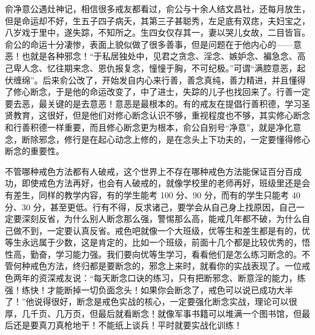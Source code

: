 俞净意公遇灶神记，相信很多戒友都看过，俞公与十余人结文昌社，还每月放生，但是命运却不好，生五子四子病夭，其第三子甚聪秀，左足底有双痣，夫妇宝之，八岁戏于里中，遂失踪，不知所之。生四女仅存其一，妻以哭儿女故，二目皆盲。俞公的命运十分凄惨，表面上貌似做了很多善事，但是问题在于他内心的——意恶！也就是各种邪念！“于私居独处中，见君之贪念、淫念、嫉妒念、褊急念、高己卑人念、忆往期来念、恩仇报复念，憧憧于胸，不可纪极。”可谓“满腔意恶，起伏缠绵”。后来俞公改了，开始发自内心来行善，善念真纯，善力精进，并且懂得了修心断念，于是他的命运改变了，中了进士，失踪的儿子也找回来了。行善一定要去恶，最关键的是去意恶！意恶是最根本的。有的戒友在提倡行善积德，学习圣贤教育，这很好，但是他们对修心断念认识不够，重视程度也不够，其实修心断念和行善积德一样重要，而且修心断念更为根本，俞公自别号“净意”，就是净化意念，断除邪念，修行是在起心动念上修的，是在念头上下功夫的，一定要懂得修心断念的重要性。

不管哪种戒色方法都有人破戒，这个世界上不存在哪种戒色方法能保证百分百成功，即使戒色方法再好，也会有人破戒的，就像学校里的老师再好，班级里还是会有差生，同样的教学内容，有的学生能考 100 分、90 分，而有的学生只能考 40 分、30 分，甚至更低。行有不得，反求诸己，要学会从自己身上找原因，自己一定要深刻反省，为什么别人断念那么强，警惕那么高，能戒几年都不破，为什么自己做不到，一定要认真反省。戒色吧就像一个大班级，优等生和差生都是有的，优等生永远属于少数，这是肯定的，比如一个班级，前面十几个都是比较优秀的，悟性高，勤奋，学习能力强。我们要向优等生学习，看看他们是怎么练习断念的。不管何种戒色方法，终归都是要断念的，邪念上来时，就看你的实战表现了。一位戒色两年的资深戒友说：“每天断念口诀的练习，只有把断邪念、断意淫的能力，练强！练快！才能断掉一切负面念头！如果你会断念了，戒色可以说已成功大半了！”他说得很好，断念是戒色实战的核心，一定要强化断念实战，理论可以很厚，几千页、几万页，但最后就看断念！就像军事书籍可以堆满一个图书馆，但最后还是要真刀真枪地干！不能纸上谈兵！平时就要实战化训练！

